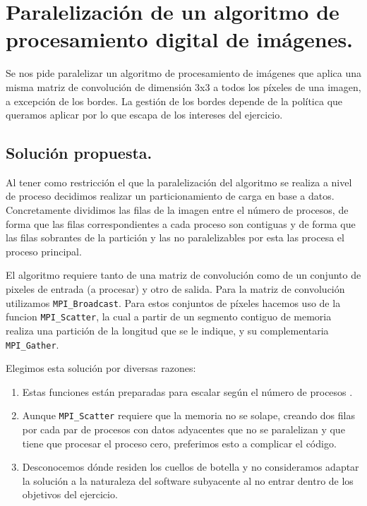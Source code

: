 \section{Paralelización de un algoritmo de procesamiento digital de imágenes.}

Se nos pide paralelizar un algoritmo de procesamiento de imágenes que aplica una misma
matriz de convolución de dimensión 3x3 a todos los píxeles de una imagen, a excepción de los bordes. La
gestión de los bordes depende de la política que queramos aplicar por lo que escapa de
los intereses del ejercicio.
\subsection{Solución propuesta.}

Al tener como restricción el que la paralelización del algoritmo
se realiza a nivel de proceso decidimos realizar un particionamiento de carga en base
a datos. Concretamente dividimos las filas de la imagen entre el número de procesos, de forma
que las filas correspondientes a cada proceso son contiguas y de forma que las filas
sobrantes de la partición y las no paralelizables por esta las procesa el proceso principal.

El algoritmo requiere tanto de una matriz de convolución como de un conjunto de pixeles de entrada
(a procesar) y otro de salida. Para la matriz de convolución utilizamos \texttt{MPI\_Broadcast}.
Para estos conjuntos de píxeles hacemos uso de la funcion \texttt{MPI\_Scatter}, la cual a partir
de un segmento contiguo de memoria realiza una partición de la longitud que se le indique, y su
complementaria \texttt{MPI\_Gather}.

Elegimos esta solución por diversas razones:

\begin{enumerate}
    \item Estas funciones están preparadas para escalar según el número de procesos \cite{MPIBroadcast}.
    \item Aunque \texttt{MPI\_Scatter} requiere que la memoria no se solape, creando dos
    filas por cada par de procesos con datos adyacentes que no se paralelizan y que tiene
    que procesar el proceso cero, preferimos esto a complicar el código.
    \item Desconocemos dónde residen los cuellos de botella y no consideramos adaptar la solución
    a la naturaleza del software subyacente al no entrar dentro de los objetivos del ejercicio.
\end{enumerate}

